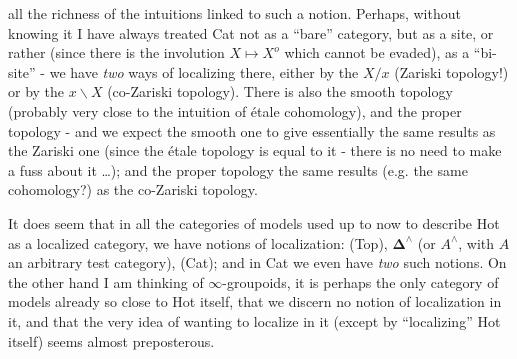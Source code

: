 \documentclass[11pt]{article}
\newcommand{\printedpage}[1]{\marginpar{\footnotesize p.~#1}}
\newcommand{\msp}[1]{\marginpar{\footnotesize [#1]}}
\begin{document}
\msp{page 83}
all the richness of the intuitions linked to such a notion. Perhaps, without knowing it I have always treated Cat not as a ``bare'' category, but as a site, or rather (since there
\printedpage{53}
is the involution $X \longmapsto X^{o}$ which cannot be evaded), as a ``bi-site'' - we have \textit{two} ways of localizing there, either by the $X/x$ (Zariski topology!) or by the $x\backslash X$ (co-Zariski topology). There is also the smooth topology (probably very close to the intuition of étale cohomology), and the proper topology - and we expect the smooth one to give essentially the same results as the Zariski one (since the étale topology is equal to it - there is no need to make a fuss about it \dots); and the proper topology the same results (e.g. the same cohomology?) as the co-Zariski topology. %

It does seem that in all the categories of models used up to now to describe Hot as a localized category, we have notions of localization: (Top), $\mathbf{\Delta}^\wedge$ (or $A^\wedge$, with $A$ an arbitrary test category), (Cat); and in Cat we even have \textit{two} such notions. On the other hand I am thinking of $\infty$-groupoids, it is perhaps the only category of models already so close to Hot itself, that we discern no notion of localization in it, and that the very idea of wanting to localize in it (except by ``localizing'' Hot itself) seems almost
\msp{page 84}
preposterous.
\end{document}
